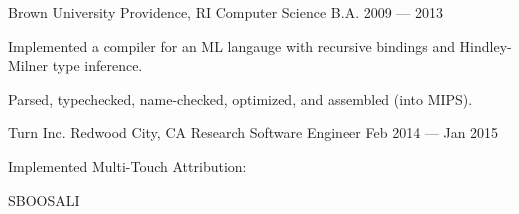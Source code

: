 \documentclass [11pt] {resume}
\begin{document}
\makecvheader[C]



  \begin{cventries}
    \cventry
    {Brown University}
    {Providence, RI}
    {Computer Science B.A.}
    {2009 — 2013}
    {\begin{cvitems}   \item {Implemented a compiler for an ML langauge with recursive bindings and Hindley-Milner type inference.\par Parsed, typechecked, name-checked, optimized, and assembled (into MIPS).} \end{cvitems}}
  \end{cventries}



  \begin{cventries}
    \cventry
    {Turn Inc.}
    {Redwood City, CA}
    {Research Software Engineer}
    {Feb 2014 — Jan 2015}
    {\begin{cvitems}   \item {Implemented Multi-Touch Attribution: } \end{cvitems}}
  \end{cventries}










\makecvfooter
    {SBOOSALI}
    {\thepage}
    {\pageref{LastPage}}

\end{document}
